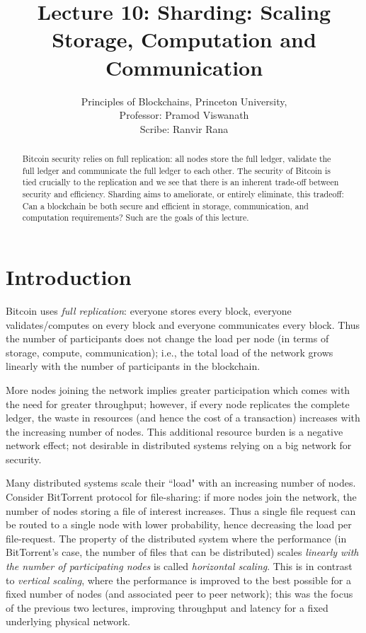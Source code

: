 \documentclass{article}
\title{Lecture 10: Sharding: Scaling Storage, Computation and Communication}
\author{Principles of Blockchains, Princeton University,  \\ Professor:  Pramod Viswanath \\ Scribe:  Ranvir Rana}
\begin{document}
\maketitle

\begin{abstract}
Bitcoin security relies on full replication: all nodes store the full ledger, validate the full ledger and communicate the full ledger to each other. The security of Bitcoin is tied crucially to the replication and we see that there is an inherent trade-off between security and efficiency. Sharding aims to ameliorate, or entirely eliminate, this tradeoff: Can a blockchain be both secure and efficient in storage, communication, and computation requirements? Such are the goals of this lecture. 
\end{abstract}

\section{Introduction}

Bitcoin uses {\em full replication}: everyone stores every block, everyone validates/computes on every block and everyone communicates every block. Thus the number of participants does not change the load per node (in terms of storage, compute, communication); i.e., the total load of the network grows linearly with the number of participants in the blockchain. 

More nodes joining the network implies greater participation which comes with the need for greater throughput; however, if every node replicates the complete ledger, the waste in resources (and hence the cost of a transaction) increases with the increasing number of nodes. This additional resource burden is a negative network effect; not desirable in distributed systems relying on a big network for security. 

Many distributed systems scale their ``load" with an increasing number of nodes. %
Consider BitTorrent protocol for file-sharing:  if more nodes join the network, the number of nodes storing a file of interest increases. Thus a single file request can be routed to a single node with lower probability, hence decreasing the load per file-request. 
The property of the distributed system where the performance (in BitTorrent's case, the number of files that can be distributed) scales {\em linearly with the number of participating nodes} is called {\em horizontal scaling}. This is in contrast to {\em vertical scaling}, where the performance is improved to the best possible for a fixed number of nodes (and associated peer to peer network); this was the focus of the previous two lectures, improving throughput  and latency for a fixed underlying physical network. 
\end{document}

